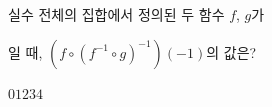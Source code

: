 실수 전체의 집합에서 정의된 두 함수 $f$, $g$가 \par\smallskip{}\par\smallskip\noindent 일 때, $(f\circ(f^{-1}\circ g)^{-1})(-1)$의 값은?
\begin{choices32}{$0$}{$1$}{$2$}{$3$}{$4$}\end{choices32}
